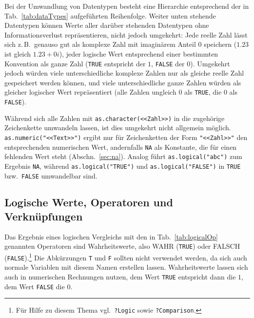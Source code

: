 Bei der Umwandlung von Datentypen besteht eine Hierarchie entsprechend der in Tab.\ \ref{tab:dataTypes} aufgeführten Reihenfolge. Weiter unten stehende Datentypen können Werte aller darüber stehenden Datentypen ohne Informationsverlust repräsentieren, nicht jedoch umgekehrt: Jede reelle Zahl lässt sich z.\,B.\ genauso gut als komplexe Zahl mit imaginärem Anteil $0$ speichern ($1.23$ ist gleich $1.23+0i$), jeder logische Wert entsprechend einer bestimmten Konvention als ganze Zahl (\lstinline!TRUE! entspricht der $1$, \lstinline!FALSE! der $0$). Umgekehrt jedoch würden viele unterschiedliche komplexe Zahlen nur als gleiche reelle Zahl gespeichert werden können, und viele unterschiedliche ganze Zahlen würden als gleicher logischer Wert repräsentiert (alle Zahlen ungleich $0$ als \lstinline!TRUE!, die $0$ als \lstinline!FALSE!).

Während sich alle Zahlen mit \lstinline!as.character(<<Zahl>>)! in die zugehörige Zeichenkette umwandeln lassen, ist dies umgekehrt nicht allgemein möglich. \lstinline!as.numeric("<<Text>>")! ergibt nur für Zeichenketten der Form \lstinline!"<<Zahl>>"! den entsprechenden numerischen Wert, andernfalls \lstinline!NA! als Konstante, die für einen fehlenden Wert steht (Abschn.\ \ref{sec:na}). Analog führt \lstinline!as.logical("abc")! zum Ergebnis \lstinline!NA!, während \lstinline!as.logical("TRUE")! und \lstinline!as.logical("FALSE")! in \lstinline!TRUE! bzw.\ \lstinline!FALSE! umwandelbar sind.

\subsection{Logische Werte, Operatoren und Verknüpfungen}
\label{sec:isTRUE}

Das Ergebnis eines logischen Vergleichs mit den in Tab.\ \ref{tab:logicalOp} genannten Operatoren sind Wahrheitswerte, also WAHR (\lstinline!TRUE!) oder FALSCH (\lstinline!FALSE!).\footnote{Für Hilfe zu diesem Thema vgl.\ \lstinline!?Logic! sowie \lstinline!?Comparison!.} Die Abkürzungen \lstinline!T! und \lstinline!F! sollten nicht verwendet werden, da sich auch normale Variablen mit diesem Namen erstellen lassen. Wahrheitswerte lassen sich auch in numerischen Rechnungen nutzen, dem Wert \lstinline!TRUE! entspricht dann die $1$, dem Wert \lstinline!FALSE! die $0$.

